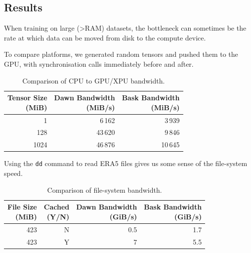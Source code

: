 \subsection{Results}
\label{section:transfer-results}

When training on large (\textgreater RAM) datasets, the bottleneck can sometimes be the rate at which data can be moved from disk to the compute device.

To compare platforms, we generated random tensors and pushed them to the GPU, with synchronisation calls immediately before and after.

\begin{table}[t]
    \centering
    \begin{tabular}{@{}rrr@{}} \toprule
      \shortstack[r]{Tensor Size\\ (MiB)}
      & \shortstack[r]{Dawn Bandwidth\\ (MiB/s)}
      & \shortstack[r]{Bask Bandwidth\\ (MiB/s)} \\ \midrule
          1 & 6\,162 & 3\,939 \\
  128 & 43\,620 & 9\,846\\
          1024 & 46\,876 & 10\,645\\ \bottomrule
    \end{tabular}
    \caption{Comparison of CPU to GPU/XPU bandwidth.}
    \label{tab:xpu-gpu-bandwidth}
\end{table}

Using the \texttt{dd} command to read ERA5 files gives us some sense of the file-system speed.

\begin{table}[t]
    \centering
    \begin{tabular}{@{}rrrr@{}} \toprule
        \shortstack[r]{File Size\\ (MiB)} 
      & \shortstack[r]{Cached\\ (Y/N)} 
      & \shortstack[r]{Dawn Bandwidth\\ (GiB/s)}
      & \shortstack[r]{Bask Bandwidth\\ (GiB/s)} \\ \midrule
           423 & N & 0.5 & 1.7 \\
   423 & Y & 7 & 5.5 \\ \bottomrule
    \end{tabular}
    \caption{Comparison of file-system bandwidth.}
    \label{tab:file-system-bandwidth}
\end{table}

